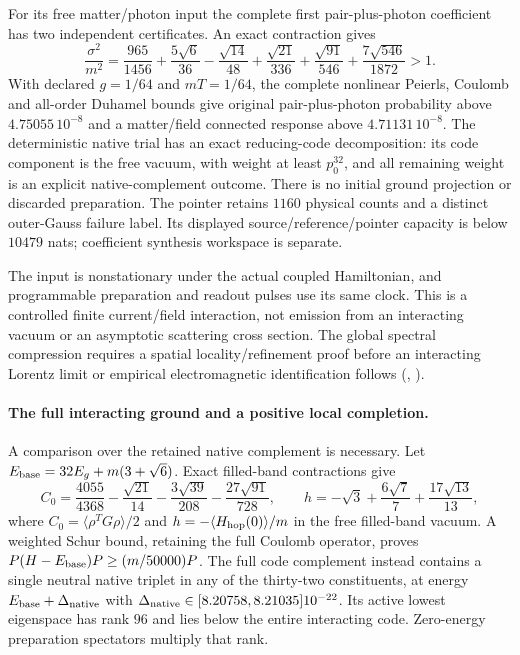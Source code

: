 For its free matter/photon input the complete first pair-plus-photon
coefficient has two independent certificates. An exact contraction gives
\[
 \frac{\sigma^2}{m^2}=\frac{965}{1456}+\frac{5\sqrt6}{36}
 -\frac{\sqrt{14}}{48}+\frac{\sqrt{21}}{336}
 +\frac{\sqrt{91}}{546}+\frac{7\sqrt{546}}{1872}>1.
\]
With declared $g=1/64$ and $mT=1/64$, the complete nonlinear Peierls,
Coulomb and all-order Duhamel bounds give original pair-plus-photon
probability above $4.75055\,10^{-8}$ and a matter/field connected
response above $4.71131\,10^{-8}$. The deterministic native trial has
an exact reducing-code decomposition: its code component is the free
vacuum, with weight at least $p_0^{32}$, and all remaining weight is an
explicit native-complement outcome. There is no initial ground
projection or discarded preparation. The pointer retains $1160$
physical counts and a distinct outer-Gauss failure label. Its displayed
source/reference/pointer capacity is below $10479$ nats; coefficient
synthesis workspace is separate.

The input is nonstationary under the actual coupled Hamiltonian, and
programmable preparation and readout pulses use its same clock. This
is a controlled finite current/field interaction, not emission from an
interacting vacuum or an asymptotic scattering cross section. The
global spectral compression requires a spatial locality/refinement
proof before an interacting Lorentz limit or empirical electromagnetic
identification follows
(, \cite{ophrepo}).

\paragraph{The full interacting ground and a positive local completion.}
A comparison over the retained native complement is necessary.
Let $E_{\rm base}=32E_g+m(3+\sqrt6)$. Exact filled-band contractions give
\[
 C_0=\frac{4055}{4368}-\frac{\sqrt{21}}{14}
       -\frac{3\sqrt{39}}{208}-\frac{27\sqrt{91}}{728},\qquad
 h=-\sqrt3+\frac{6\sqrt7}{7}+\frac{17\sqrt{13}}{13},
\]
where $C_0=\langle\rho^TG\rho\rangle/2$ and
$h=-\langle H_{\rm hop}(0)\rangle/m$ in the free filled-band vacuum.
A weighted Schur bound, retaining the full Coulomb operator, proves
$P(H-E_{\rm base})P\ge(m/50000)P$. The full code complement instead
contains a single neutral native triplet in any of the thirty-two
constituents, at energy $E_{\rm base}+\Delta_{\rm native}$ with
$\Delta_{\rm native}\in[8.20758,8.21035]10^{-22}$.
Its active lowest eigenspace has rank $96$ and lies below the entire
interacting code. Zero-energy preparation spectators multiply that rank.

